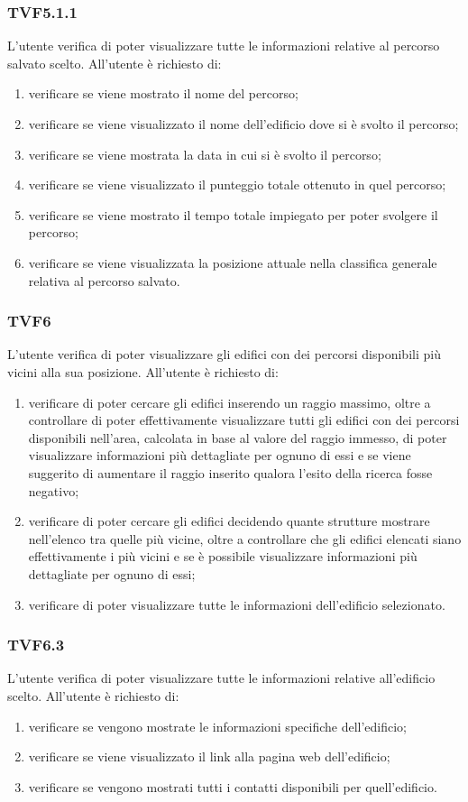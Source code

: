 		\subsubsection{TVF5.1.1}
			L'utente verifica di poter visualizzare tutte le informazioni relative al percorso salvato scelto.
			All'utente è richiesto di:
			\begin{enumerate}
				\item verificare se viene mostrato il nome del percorso;
				\item verificare se viene visualizzato il nome dell'edificio dove si è svolto il percorso;
				\item verificare se viene mostrata la data in cui si è svolto il percorso;
				\item verificare se viene visualizzato il punteggio totale ottenuto in quel percorso;
				\item verificare se viene mostrato il tempo totale impiegato per poter svolgere il percorso;
				\item verificare se viene visualizzata la posizione attuale nella classifica generale relativa al percorso salvato.
			\end{enumerate}
		\subsubsection{TVF6}
			L'utente verifica di poter visualizzare gli edifici con dei percorsi disponibili più vicini alla sua posizione.
			All'utente è richiesto di:
			\begin{enumerate}
				\item verificare di poter cercare gli edifici inserendo un raggio massimo, oltre a controllare di poter effettivamente visualizzare tutti gli edifici con dei percorsi disponibili nell'area, calcolata in base al valore del raggio immesso, di poter visualizzare informazioni più dettagliate per ognuno di essi e se viene suggerito di aumentare il raggio inserito qualora l'esito della ricerca fosse negativo;
				\item verificare di poter cercare gli edifici decidendo quante strutture mostrare nell'elenco tra quelle più vicine, oltre a controllare che gli edifici elencati siano effettivamente i più vicini e se è possibile visualizzare informazioni più dettagliate per ognuno di essi;
				\item verificare di poter visualizzare tutte le informazioni dell'edificio selezionato.
			\end{enumerate}
		\subsubsection{TVF6.3}
			L'utente verifica di poter visualizzare tutte le informazioni relative all'edificio scelto.
			All'utente è richiesto di:
			\begin{enumerate}
				\item verificare se vengono mostrate le informazioni specifiche dell'edificio;
				\item verificare se viene visualizzato il link alla pagina web dell'edificio;
				\item verificare se vengono mostrati tutti i contatti disponibili per quell'edificio.
			\end{enumerate}
